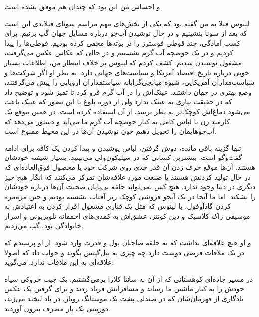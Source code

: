 \begin{journal}
و احساس من این بود که چندان هم موفق نشده است.

لینوس قبلا به من گفته بود که یکی از بخش‌های مهم مراسم سونای فنلاندی این
است که بعد از سونا بنشینیم و در حال نوشیدن آب‌جو درباره مسايل جهان گپ
بزنیم. برای کسب آمادگی، چند قوطی فوسترز را در بوته‌ها مخفی کرده بودیم. قوطی‌ها را پیدا کردیم و در یک
حوضچه آب گرم  نشستیم و در حالی که عکاس عکس می‌گرفت، مشغول
نوشیدن شدیم. کشف کردم که لینوس بر خلاف انتظار من، اطلاعات بسیار خوبی
درباره تاریخ اقتصاد آمریکا و سیاست‌های جهانی دارد. به نظر او اگر شرکت‌ها
و سیاست‌مداران آمریکایی، شیوه میانجی‌گرایانه سیاستمداران اروپایی‌ را پیش‌
می‌گرفتند، وضع بهتری در جهان داشتند. عینک‌اش را در آب گرم فرو کرد تا
تمیز شود و توضیح داد که در حقیقت نیازی به عینک ندارد ولی از دوره بلوغ
با این تصور که عینک باعث می‌شود دماغ‌اش کوچک‌تر به نظر برسد، از آن
استفاده کرده است. در همین موقع یک کارمند زن با لباس کامل به کنار حوضچه
آب گرم ما می‌آید و دستور می‌دهد که آب‌جوهایمان را تحویل دهیم چون نوشیدن
آن‌ها در این محیط ممنوع است.

تنها گزینه باقی مانده، دوش گرفتن،‌ لباس پوشیدن و پیدا کردن یک کافه برای
ادامه گفت‌و‌گو است. بیشترین کسانی که در سیلیکون‌ولی می‌بینید، بسیار شیفته
خودشان هستند. آن‌ها موقع حرف زدن آن قدر جدی روی شرکت خود یا محصول
فوق‌العاده‌ای که در حال تولید کردنش هستند یا صنعت مورد علاقه‌شان تمرکز
می‌کنند که انگار هیچ چیز دیگری در دنیا وجود ندارد. هیچ کس نمی‌تواند حلقه
بی‌پایان صحبت ‌آن‌ها درباره خودشان را بشکند. اما ما آنجا در یک آبجو فروشی
کوچک زیر آفتاب نشسته بودیم و حین مزه‌مزه کردن
گادآوفول، با لینوس که مثل یک قناری مشغول اقرار
کردن به اعتیادش به موسیقی راک کلاسیک و دین کونتز، عشق‌اش به کمدی‌های احمقانه تلویزیونی و اسرار خانوادگی بود،
گپ‌ مي‌زدیم.

و او هیچ علاقه‌ای نداشت که به حلقه صاحبان پول و قدرت وارد شود. از او
پرسیدم که در یک ملاقات فرضی دوست دارد چه چیزی به بیل‌گیتس بگوید و جواب
داد که اصولا علاقه‌ای به این ملاقات ندارد. می‌گوید: 

در مسیر جاده‌ای کوهستانی که از آن به سانتا کلارا برمی‌گشتیم، یک جیپ
چروکی سیاه خودش را به کنار ماشین ما رساند و مسافرانش فریاد زدند
 و برای گرفتن یک عکس یادگاری از قهرمان‌شان که در
صندلی پشت یک موستانگ روباز، در باد لبخند می‌زند، دوربینی یک‌ بار مصرف
بیرون آوردند.


\end{journal}
